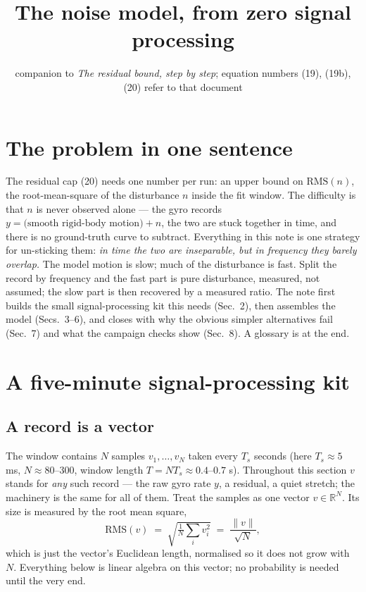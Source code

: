 \documentclass[10pt]{article}
\title{\vspace{-16mm}\textbf{The noise model, from zero signal
processing}\vspace{-3mm}}
\date{\small companion to \emph{The residual bound, step by step};
equation numbers (19), (19b), (20) refer to that document}
\newcommand{\rms}{\mathrm{RMS}}
\begin{document}
\maketitle

\section{The problem in one sentence}

The residual cap (20) needs one number per run: an upper bound on
$\rms(n)$, the root-mean-square of the disturbance $n$ inside the fit
window. The difficulty is that $n$ is never observed alone --- the
gyro records $y = \text{(smooth rigid-body motion)} + n$, the two are
stuck together in time, and there is no ground-truth curve to
subtract. Everything in this note is one strategy for un-sticking
them: \emph{in time the two are inseparable, but in frequency they
barely overlap.} The model motion is slow; much of the disturbance is
fast. Split the record by frequency and the fast part is pure
disturbance, measured, not assumed; the slow part is then recovered
by a measured ratio. The note first builds the small signal-processing
kit this needs (Sec.~2), then assembles the model (Secs.~3--6), and
closes with why the obvious simpler alternatives fail (Sec.~7) and
what the campaign checks show (Sec.~8). A glossary is at the end.

\section{A five-minute signal-processing kit}

\subsection{A record is a vector}

The window contains $N$ samples $v_1, \dots, v_N$ taken every $T_s$
seconds (here $T_s \approx 5$ ms, $N \approx 80$--$300$, window
length $T = NT_s \approx 0.4$--$0.7$ s). Throughout this section $v$
stands for \emph{any} such record --- the raw gyro rate $y$, a
residual, a quiet stretch; the machinery is the same for all of
them. Treat the samples as one vector
$v \in \mathbb{R}^N$. Its size is measured by the root mean square,
\begin{equation}
  \rms(v) \;=\; \sqrt{\tfrac1N \textstyle\sum_i v_i^2}
  \;=\; \frac{\|v\|}{\sqrt N},
  \tag{N1}
\end{equation}
which is just the vector's Euclidean length, normalised so it does
not grow with $N$. Everything below is linear algebra on this vector;
no probability is needed until the very end.
\end{document}
